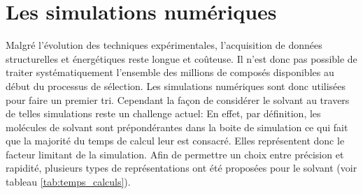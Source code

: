 \section{Les simulations numériques}
Malgré l'évolution des techniques expérimentales, l'acquisition de données structurelles et énergétiques reste longue et coûteuse. Il n'est donc pas possible de traiter systématiquement l'ensemble des millions de composés disponibles au début du processus de sélection. Les simulations numériques sont donc utilisées pour faire un premier tri. Cependant la façon de considérer le solvant au travers de telles simulations reste un challenge actuel: En effet, par définition, les molécules de solvant sont prépondérantes dans la boite de simulation ce qui fait que la majorité du temps de calcul leur est consacré. Elles représentent donc le facteur limitant de la simulation. Afin de permettre un choix entre précision et rapidité, plusieurs types de représentations ont été proposées pour le solvant\cite{Skyner_review_2015, Reddy_free_2014, brown_free_2010} (voir tableau \ref{tab:temps_calculs}).



